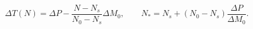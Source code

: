 \begin{equation}
\Delta T(N)=\Delta P-
       \frac{N-N_s}{N_0-N_s}\Delta M_0,\qquad
 N_* = N_s+(N_0-N_s)\frac{\Delta P}{\Delta M_0}.
 \label{eq:schedule-amortization}
\end{equation}
